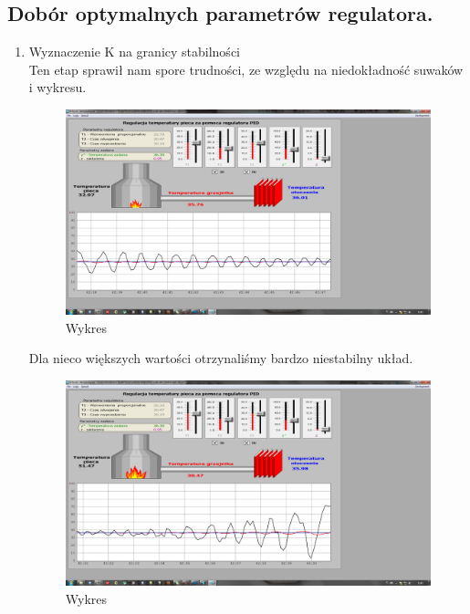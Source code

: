 \documentclass[a4paper,10pt]{article}
\begin{document}
\subsection{Dobór optymalnych parametrów regulatora.}\label{sec:zad2}
\begin{enumerate}
	\item Wyznaczenie K na granicy stabilności\\
		Ten etap sprawił nam spore trudności, ze względu na niedokładność suwaków i wykresu.
		\begin{figure}[!h]
		    \centering
			\includegraphics[width=120mm]{CW6-T130-(Kkr)-T220-T330.png}
			\caption{Wykres}
		    \label{fig:Rysunek}
		\end{figure}
		Dla nieco większych wartości otrzynaliśmy bardzo niestabilny układ.		
		\begin{figure}[!h]
		    \centering
			\includegraphics[width=120mm]{CW6-T130+(Kkr)-T220-T330.png}
			\caption{Wykres}
		    \label{fig:Rysunek}
		\end{figure}

\end{enumerate}
\end{document}

